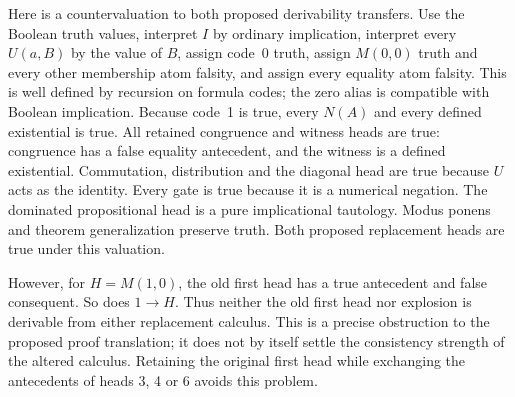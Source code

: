 Here is a countervaluation to both proposed derivability transfers.
Use the Boolean truth values, interpret $I$ by ordinary implication,
interpret every $U(a,B)$ by the value of $B$, assign code~0 truth,
assign $M(0,0)$ truth and every other membership atom falsity, and
assign every equality atom falsity. This is well defined by recursion
on formula codes; the zero alias is compatible with Boolean implication.
Because code~1 is true, every $N(A)$ and every defined existential is
true. All retained congruence and witness heads are true: congruence has
a false equality antecedent, and the witness is a defined existential.
Commutation, distribution and the diagonal head are true because $U$
acts as the identity. Every gate is true because it is a numerical
negation. The dominated propositional head is a pure implicational
tautology. Modus ponens and theorem generalization preserve truth.
Both proposed replacement heads are true under this valuation.

However, for $H=M(1,0)$, the old first head has a true antecedent and
false consequent. So does $1\to H$. Thus neither the old first head
nor explosion is derivable from either replacement calculus.
This is a precise obstruction to the proposed proof translation;
it does not by itself settle the consistency strength of the altered
calculus. Retaining the original first head while exchanging the
antecedents of heads 3, 4 or 6 avoids this problem.

